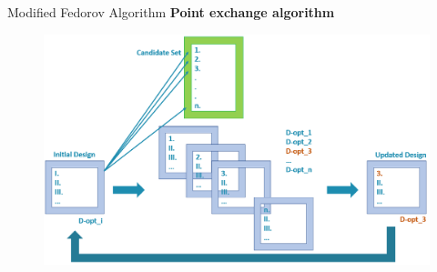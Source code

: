 \documentclass[11pt,t]{beamer}
\begin{document}
\begin{frame}{Modified Fedorov Algorithm}
\textbf{Point exchange algorithm}
	\begin{figure}
		\centering
		\includegraphics[scale = .5]{mygraphics/ModFed.png}
	\end{figure}
\end{frame}

%
\end{document}
